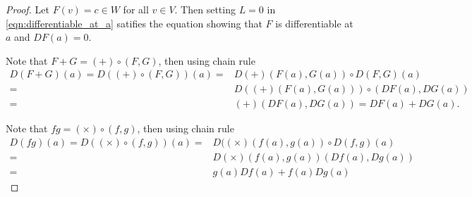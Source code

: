 \documentclass[11pt,a4paper]{article}
\begin{document}
\begin{proof}
 Let $F(v) = c\in W$ for all $v\in V$. Then setting $L = 0$ in \eqref{eqn:differentiable_at_a} satifies the equation showing that $F$ is differentiable at $a$ and $DF(a) = 0$.

 Note that $F+G = (+)\circ (F,G)$, then using chain rule
\begin{align*}
D(F+G)(a) = D((+)\circ (F,G))(a) =& D(+)(F(a),G(a))\circ D(F,G)(a) \\
=& D((+)(F(a),G(a)))\circ (DF(a),DG(a)) \\ 
=& (+)(DF(a),DG(a)) = DF(a)+DG(a).
\end{align*}

 Note that $fg = (\times)\circ (f,g)$, then using chain rule
\begin{align*}
D(fg)(a) = D((\times)\circ (f,g))(a) =& D((\times)(f(a),g(a)) \circ D(f,g)(a) \\
=& D(\times)(f(a),g(a))(Df(a),Dg(a)) \\
=& g(a)Df(a)+f(a)Dg(a)
\end{align*}



\end{proof}
\end{document}
